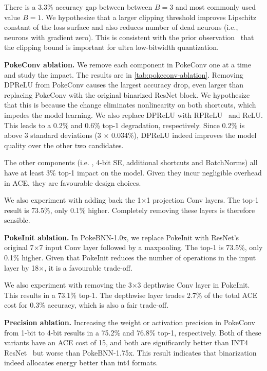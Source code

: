 There is a 3.3\% accuracy gap between between $B=3$ and most commonly used value $B=1$. We hypothesize that a larger clipping threshold improves Lipschitz constant of the loss surface and also reduces number of dead neurons (i.e., neurons with gradient zero). This is consistent with the prior observation~\cite{Abdolrashidi2021pareto, choi2018pact} that the clipping bound is important for ultra low-bitwidth quantization.

\textbf{PokeConv ablation.} We remove each component in PokeConv one at a time and study the impact. The results are in \ref{tab:pokeconv-ablation}.
Removing DPReLU from PokeConv causes the largest accuracy drop, even larger than replacing PokeConv with the original binarized ResNet block. We hypothesize that this is because the change eliminates nonlinearity on both shortcuts, which impedes the model learning. We also replace DPReLU with RPReLU~\cite{Liu2020reactnet} and ReLU. This leads to a 0.2\% and 0.6\% top-1 degradation, respectively. Since 0.2\% is above 3 standard deviations (3 $\times$ 0.034\%), DPReLU indeed improves the model quality over the other two candidates. 

The other components (i.e. , 4-bit SE, additional shortcuts and BatchNorms) all have at least 3\% top-1 impact on the model. Given they incur negligible overhead in ACE, they are favourable design choices.

We also experiment with adding back the 1$\times$1 projection Conv layers. The top-1 result is 73.5\%, only 0.1\% higher. Completely removing these layers is therefore sensible.

\textbf{PokeInit ablation.} In PokeBNN-1.0x, we replace PokeInit with ResNet's original 7$\times$7 input Conv layer followed by a maxpooling. The top-1 is 73.5\%, only 0.1\% higher. Given that PokeInit reduces the number of operations in the input layer by 18$\times$, it is a favourable trade-off.

We also experiment with removing the 3$\times$3 depthwise Conv layer in PokeInit. This results in a 73.1\% top-1. The depthwise layer trades 2.7\% of the total ACE cost for 0.3\% accuracy, which is also a fair trade-off.

\textbf{Precision ablation.} Increasing the weight or activation precision in PokeConv from 1-bit to 4-bit results in a 75.2\% and 76.8\% top-1, respectively. Both of these variants have an ACE cost of 15, and both are significantly better than INT4 ResNet~\cite{Abdolrashidi2021pareto} but worse than PokeBNN-1.75x. This result indicates that binarization indeed allocates energy better than int4 formats. 

